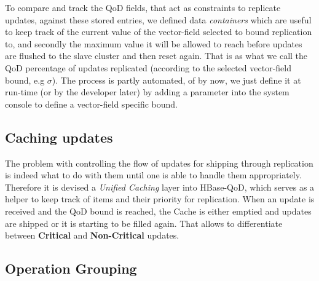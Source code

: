 To compare and track the QoD fields, that act as constraints to replicate updates, against these stored entries, we defined data \emph{containers} which are useful to keep track of the current value of the vector-field selected to bound replication to, and secondly the maximum value it will be allowed to reach before updates are flushed to the slave cluster and then reset again. That is as what we call the QoD percentage of updates replicated (according to the selected vector-field bound, e.g $\sigma$). The process is partly automated, of by now, we just define it at run-time (or by the developer later) by adding a parameter into the system console to define a vector-field specific bound.

\subsection{Caching updates}\label{architecture:caching}
The problem with controlling the flow of updates for shipping through replication is indeed what to do with them until one is able to handle them appropriately. Therefore it is devised a \emph{Unified Caching} layer into HBase-QoD, which serves as a helper to keep track of items and their priority for replication. When an update is received and the QoD bound is reached, the Cache is either emptied and updates are shipped or it is starting to be filled again. That allows to differentiate between \textbf{Critical} and \textbf{Non-Critical} updates.

\subsection{Operation Grouping}\label{grouping}






